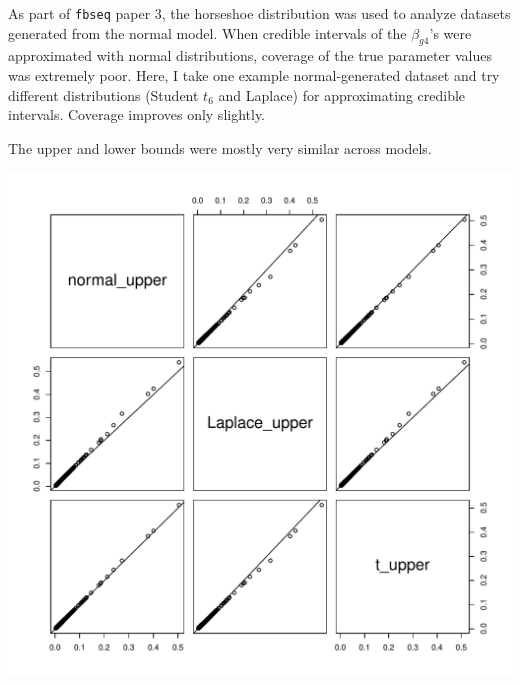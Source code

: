 \documentclass{article}
\begin{document}
\begin{flushleft}



As part of {\tt fbseq} paper 3, the horseshoe distribution was used to analyze datasets generated from the normal model. When credible intervals of the $\beta_{g4}$'s were approximated with normal distributions, coverage of the true parameter values was extremely poor. Here, I take one example normal-generated dataset and try different distributions (Student $t_6$ and Laplace)  for approximating credible intervals. Coverage improves only slightly.



The upper and lower bounds were mostly very similar across models.

\begin{minipage}{.45\textwidth}
\includegraphics[scale = 0.4]{upper}
\end{minipage} \begin{minipage}{.45\textwidth}

\end{minipage}
\end{flushleft}
\end{document}
